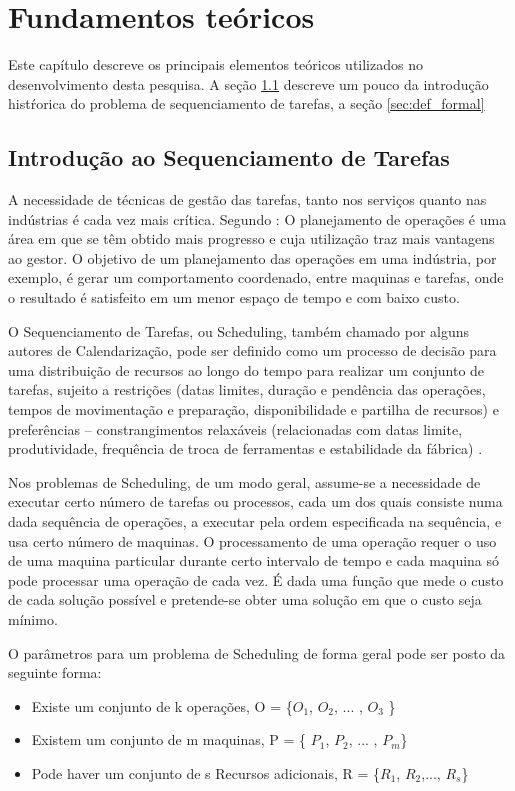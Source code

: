 \chapter{Fundamentos teóricos}

Este capítulo descreve os principais elementos teóricos utilizados no
desenvolvimento desta pesquisa. A seção \ref{sec:int_seq_tarefas} descreve um pouco da introdução histŕorica 
do problema de sequenciamento de tarefas, a seção \ref{sec:def_formal}

\section{Introdução ao Sequenciamento de Tarefas}\label{sec:int_seq_tarefas}

A necessidade de técnicas de gestão das tarefas, tanto nos serviços quanto nas indústrias é cada vez mais crítica. Segundo : O planejamento de operações é uma área em que se têm obtido mais progresso e cuja utilização traz mais vantagens ao gestor. O objetivo de um planejamento das operações em uma indústria, por exemplo, é gerar um comportamento coordenado, entre maquinas e tarefas, onde o resultado é satisfeito em um menor espaço de tempo e com baixo custo.

O Sequenciamento de Tarefas, ou Scheduling, também chamado por alguns autores de Calendarização, pode ser definido como um processo de decisão para uma distribuição de recursos ao longo do tempo para realizar um conjunto de tarefas, sujeito a restrições (datas limites, duração e pendência das operações, tempos de movimentação e preparação, disponibilidade e partilha de recursos) e preferências – constrangimentos relaxáveis (relacionadas com datas limite, produtividade, frequência de troca de ferramentas e estabilidade da fábrica) \cite{LEPAPE}.

Nos problemas de Scheduling, de um modo geral, assume-se a necessidade de executar certo número de tarefas ou processos, cada um dos quais consiste numa dada sequência de operações, a executar pela ordem especificada na sequência, e usa certo número de maquinas. O processamento de uma operação requer o uso de uma maquina particular durante certo intervalo de tempo e cada maquina só pode processar uma operação de cada vez. É dada uma função que mede o custo de cada solução possível e pretende-se obter uma solução em que o custo seja mínimo.


O parâmetros para um problema de Scheduling de forma geral pode ser posto da seguinte forma:
\begin{itemize}
\item Existe um conjunto de k operações, O = \{$O_{1}$, $O_{2}$, ... , $O_{3}$ \}
\item Existem um conjunto de m maquinas, P = \{ $P_{1}$, $P_{2}$, ... , $P_{m}$\}
\item Pode haver um conjunto de s Recursos adicionais, R = \{$R_{1}$, $R_{2}$,..., $R_{s}$\}

\end{itemize}


